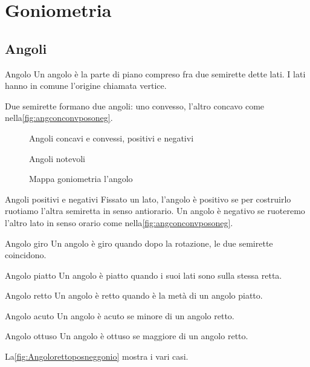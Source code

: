 \chapter{Goniometria}
\label{sec:GONIOMETRIA}
\section{Angoli}
\label{sec:gonioang}
\begin{definizionet}{Angolo}{}
Un angolo è la parte di piano compreso fra due semirette dette lati. I lati hanno in comune l'origine chiamata vertice.
\end{definizionet}

Due semirette formano due angoli: uno convesso, l'altro concavo come nella\nobs\vref{fig:angconconvposoneg}. 
\begin{figure} %
	\centering

	\caption{Angoli concavi e convessi, positivi e negativi}\label{fig:angconconvposoneg}
\end{figure}
\begin{figure} %
	\centering

	\caption{Angoli notevoli}\label{fig:Angolorettoposneggonio}
\end{figure}
\begin{figure}

%
	\caption{Mappa goniometria l'angolo}\label{fig:MappaGonometria1}
\end{figure}
\begin{definizionet}{Angoli positivi e negativi}{}
	Fissato un lato, l'angolo è positivo se per costruirlo ruotiamo l'altra semiretta in senso antiorario. Un angolo è negativo se ruoteremo l'altro lato in senso orario come nella\nobs\vref{fig:angconconvposoneg}. 
\end{definizionet}
\begin{definizionet}{Angolo giro}{}
Un angolo è giro quando dopo la rotazione, le due semirette coincidono. 
\end{definizionet}
\begin{definizionet}{Angolo piatto}{}
Un angolo è piatto quando i suoi lati sono sulla stessa retta.
\end{definizionet}
\begin{definizionet}{Angolo retto}{}
Un angolo è retto quando è la metà di un angolo piatto. 
\end{definizionet}
\begin{definizionet}{Angolo acuto}{}
Un angolo è acuto se minore di un angolo retto.
\end{definizionet}
\begin{definizionet}{Angolo ottuso}{}
Un angolo è ottuso se maggiore di un angolo retto.
\end{definizionet}
 La\nobs\vref{fig:Angolorettoposneggonio} mostra i vari casi.
